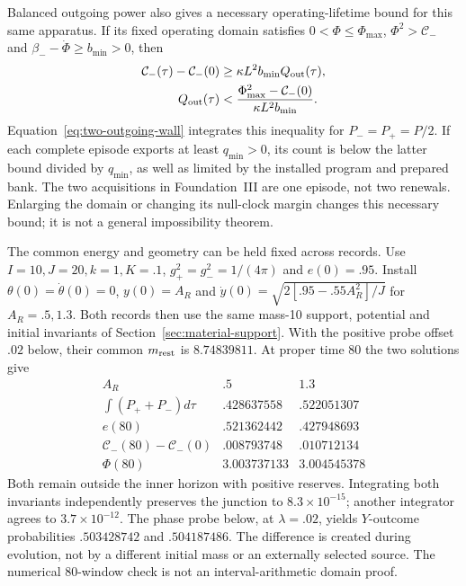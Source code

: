 \documentclass[12pt,a4paper]{article}
\begin{document}
Balanced outgoing power also gives a necessary operating-lifetime
bound for this same apparatus. If its fixed operating domain satisfies
$0<\Phi\le\Phi_{\max}$, $\Phi^2>\mathcal C_-$ and
$\beta_--\dot\Phi\ge b_{\min}>0$, then
\begin{align*}
 \mathcal C_-(\tau)-\mathcal C_-(0)
   &\ge\kappa L^2b_{\min}Q_{\rm out}(\tau),\\
 Q_{\rm out}(\tau)&<
 \frac{\Phi_{\max}^2-\mathcal C_-(0)}{\kappa L^2b_{\min}}.
\end{align*}
Equation~\eqref{eq:two-outgoing-wall} integrates this inequality for
$P_-=P_+=P/2$. If each complete episode exports at least
$q_{\min}>0$, its count is below the latter bound divided by
$q_{\min}$, as well as limited by the installed program and prepared
bank. The two acquisitions in Foundation~III are one episode, not two
renewals. Enlarging the domain or changing its null-clock margin changes
this necessary bound; it is not a general impossibility theorem.

The common energy and geometry can be held fixed across records.
Use $I=10,J=20,k=1,K=.1$, $g_+^2=g_-^2=1/(4\pi)$ and $e(0)=.95$.
Install $\theta(0)=\dot\theta(0)=0$, $y(0)=A_R$ and
$\dot y(0)=\sqrt{2[.95-.55A_R^2]/J}$ for $A_R=.5,1.3$.
Both records then use the same mass-10 support, potential and initial
invariants of Section~\ref{sec:material-support}. With the positive
probe offset $.02$ below, their common $m_{\rm rest}$ is $8.74839811$.
At proper time 80 the two solutions give
\begin{equation}\label{eq:mechanical-source-numbers}
\begin{array}{c|cc}
 A_R&.5&1.3\\\hline
 \int(P_++P_-)d\tau&.428637558&.522051307\\
 e(80)&.521362442&.427948693\\
 \mathcal C_-(80)-\mathcal C_-(0)&.008793748&.010712134\\
 \Phi(80)&3.003737133&3.004545378
\end{array}
\end{equation}
Both remain outside the inner horizon with positive reserves. Integrating
both invariants independently preserves the junction to $8.3\times10^{-15}$;
another integrator agrees to $3.7\times10^{-12}$. The phase probe below,
at $\lambda=.02$, yields $Y$-outcome probabilities $.503428742$ and
$.504187486$. The difference is created during evolution, not by a
different initial mass or an externally selected source. The numerical
80-window check is not an interval-arithmetic domain proof.
\end{document}

